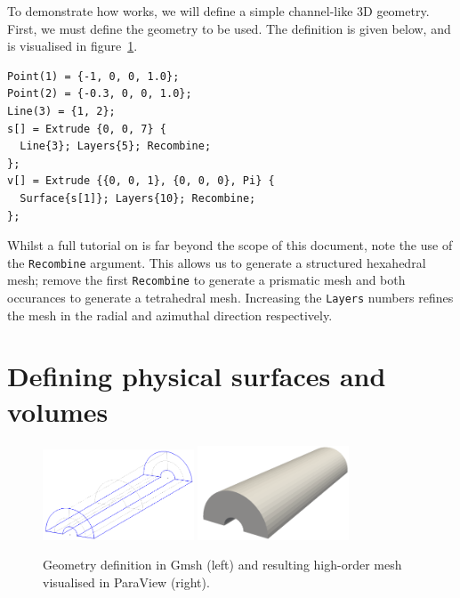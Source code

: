 To demonstrate how \nm works, we will define a simple channel-like 3D geometry.
First, we must define the \gmsh geometry to be used. The \gmsh definition is
given below, and is visualised in figure~\ref{fig:util:mc:gmsh-example}.

\begin{lstlisting}[style=XmlStyle]
Point(1) = {-1, 0, 0, 1.0};
Point(2) = {-0.3, 0, 0, 1.0};
Line(3) = {1, 2};
s[] = Extrude {0, 0, 7} {
  Line{3}; Layers{5}; Recombine;
};
v[] = Extrude {{0, 0, 1}, {0, 0, 0}, Pi} {
  Surface{s[1]}; Layers{10}; Recombine;
};
\end{lstlisting}

Whilst a full tutorial on \gmsh is far beyond the scope of this document, note
the use of the \texttt{Recombine} argument. This allows us to generate a
structured hexahedral mesh; remove the first \texttt{Recombine} to generate a
prismatic mesh and both occurances to generate a tetrahedral mesh. Increasing
the \texttt{Layers} numbers refines the mesh in the radial and azimuthal
direction respectively.

\section{Defining physical surfaces and volumes}

\begin{figure}
  \begin{center}
    \includegraphics[width=0.4\textwidth]{img/mc-example-gmsh}
    \includegraphics[width=0.4\textwidth]{img/mc-example-mesh}
  \end{center}
  \caption{Geometry definition in Gmsh (left) and resulting high-order mesh
    visualised in ParaView (right).}
  \label{fig:util:mc:gmsh-example}
\end{figure}

